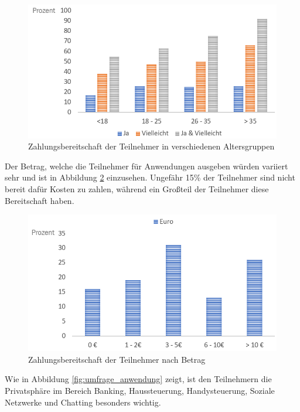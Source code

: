 \begin{figure}[h]
	\centering
	\includegraphics[width=0.9\linewidth]{Picture/umfrage_geld_gruppen}
	\caption[Zahlungsbereitschaft der Teilnehmer in verschiedenen Altersgruppen]{Zahlungsbereitschaft der Teilnehmer in verschiedenen Altersgruppen}
	\label{fig:umfrage_geld_gruppen}
\end{figure}

Der Betrag, welche die Teilnehmer für Anwendungen ausgeben würden variiert sehr und ist in Abbildung \ref{fig:umfrage_betrag} einzusehen. Ungefähr 15\% der Teilnehmer sind nicht bereit dafür Kosten zu zahlen, während ein Großteil der Teilnehmer diese Bereitschaft haben.

\begin{figure}[h]
	\centering
	\includegraphics[width=0.9\linewidth]{Picture/umfrage_betrag}
	\caption[Zahlungsbereitschaft der Teilnehmer nach Betrag]{Zahlungsbereitschaft der Teilnehmer nach Betrag}
	\label{fig:umfrage_betrag}
\end{figure}

Wie in Abbildung \ref{fig:umfrage_anwendung} zeigt, ist den Teilnehmern die Privatsphäre im Bereich Banking, Haussteuerung, Handysteuerung, Soziale Netzwerke und Chatting besonders wichtig.

